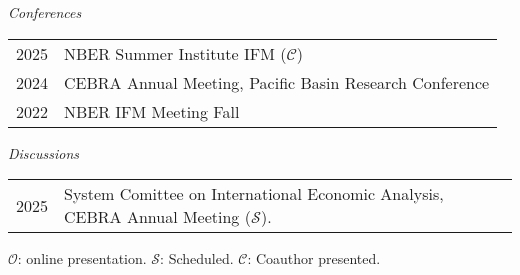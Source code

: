 \documentclass[10pt]{article}
\begin{document}
\noindent \emph{Conferences}\\[0.1in]
\begin{tabular}{@{}p{1.8cm}p{13cm}}
2025 & NBER Summer Institute IFM ($\mathcal{C}$)\\
2024 & CEBRA Annual Meeting, Pacific Basin Research Conference\\
2022& NBER IFM Meeting Fall
\end{tabular}

\noindent \emph{Discussions}\\[0.1in]
\begin{tabular}{@{}p{1.8cm}p{13cm}}
2025 &System Comittee on International Economic Analysis, CEBRA Annual Meeting ($\mathcal{S}$).
\end{tabular}


{\footnotesize $\mathcal{O}$: online presentation. $\mathcal{S}$: Scheduled. $\mathcal{C}$: Coauthor presented.}









%
%
%
\end{document}
